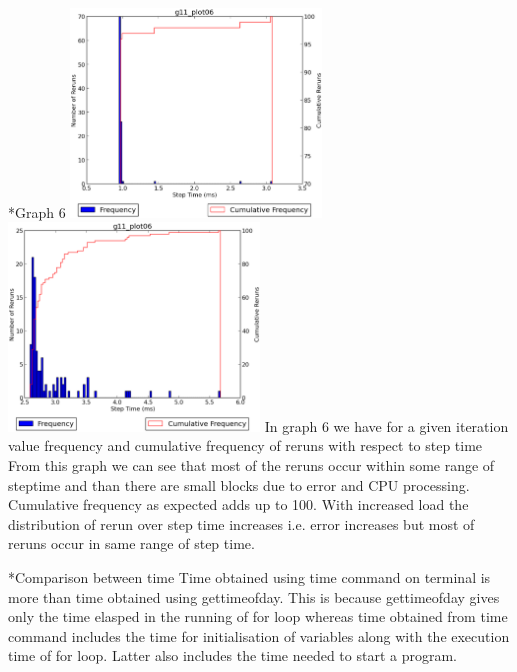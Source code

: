 \documentclass[11pt]{article}
\begin{document}
\begin{subsection}*{Graph 6}
\includegraphics[width=0.5\textwidth,keepaspectratio]{6.eps} \includegraphics[width=0.5\textwidth,keepaspectratio]{load_6.eps}
In graph 6 we have for a given iteration value frequency and cumulative frequency of reruns with respect to step time
From this graph we can see that most of the reruns occur within some range of steptime and than there are small blocks due to error and CPU processing. Cumulative frequency as expected adds up to 100.
With increased load the distribution of rerun over step time increases i.e. error increases but most of reruns occur in same range of step time.
\end{subsection}

\begin{subsection}*{Comparison between time} 
Time obtained using time command on terminal is more than time obtained using gettimeofday. This is because gettimeofday gives only the time elasped in the running of for loop whereas time obtained from time command includes the time for initialisation of variables along with the execution time of for loop. Latter also includes the time needed to start a program.  
\end{subsection}
\end{document}
